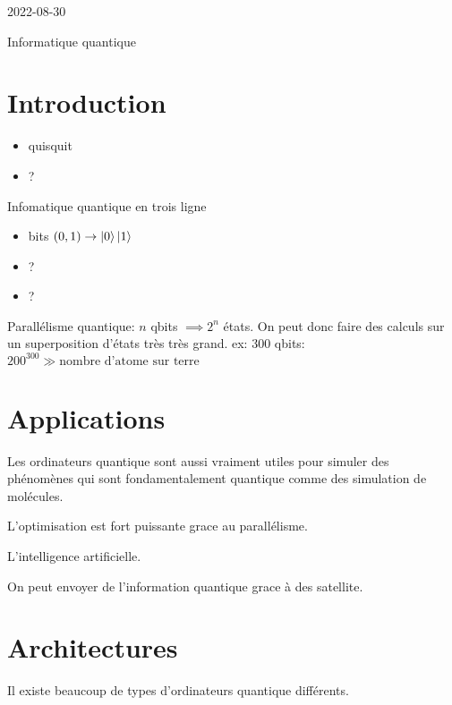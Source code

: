 


2022-08-30

{\Huge{Informatique quantique}}

\section*{Introduction}

\begin{tcolorbox}[title=Logiciels]
	\begin{itemize}
		\item quisquit
		\item ?
	\end{itemize} 
\end{tcolorbox}

Infomatique quantique en trois ligne

\begin{itemize}
	\item bits $(0,1) \to \ket{0} \ket{1}$ 
	\item ?
	\item ?
\end{itemize}


Parallélisme quantique: $n$ qbits $\implies 2^n$ états. On peut donc faire des calculs sur un superposition d'états très très grand. ex: 300 qbits:$200^{300} \gg \text{nombre d'atome sur terre} $  

\section*{Applications}

Les ordinateurs quantique sont aussi vraiment utiles pour simuler des phénomènes qui sont fondamentalement quantique comme des simulation de molécules. 

L'optimisation est fort puissante grace au parallélisme.

L'intelligence artificielle.


\begin{tcolorbox}[title=Communication Quantique]
	On peut envoyer de l'information quantique grace à des satellite. 
	 
\end{tcolorbox}

\section*{Architectures}

Il existe beaucoup de types d'ordinateurs quantique différents.

